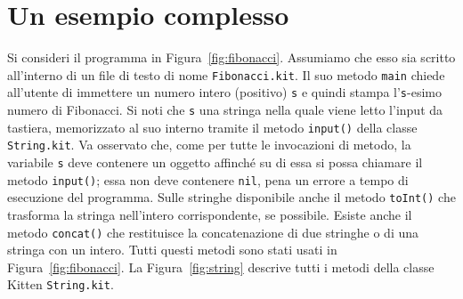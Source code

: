 \section{Un esempio \piu complesso}\label{sec:fibonacci}
%
Si consideri il programma in Figura~\ref{fig:fibonacci}. Assumiamo che esso
sia scritto all'interno di un file di testo di nome \texttt{Fibonacci.kit}.
Il suo metodo \texttt{main} chiede all'utente di immettere un numero intero
(positivo) \texttt{s} e quindi stampa l'\texttt{s}-esimo numero di Fibonacci.
Si noti che \texttt{s} \e una stringa nella quale viene letto l'input da
tastiera, memorizzato al suo interno tramite il metodo
\texttt{input()} della classe \texttt{String.kit}. Va osservato che, come
per tutte le invocazioni di metodo, la variabile \texttt{s} deve contenere
un oggetto affinch\'e su di essa si possa chiamare
il metodo \texttt{input()}; essa non deve contenere \texttt{nil}, pena
un errore a tempo di esecuzione del programma.
Sulle stringhe \e disponibile anche il metodo \texttt{toInt()} che trasforma
la stringa nell'intero corrispondente, se possibile. Esiste anche il metodo
\texttt{concat()} che restituisce la concatenazione di due stringhe o di
una stringa con un intero. Tutti questi metodi sono stati usati in
Figura~\ref{fig:fibonacci}. La Figura~\ref{fig:string} descrive tutti i
metodi della classe Kitten \texttt{String.kit}.
%
